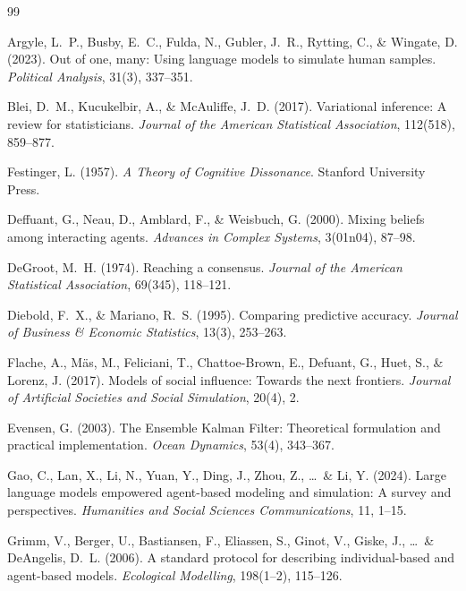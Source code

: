 \documentclass[12pt]{article}
\begin{document}
\begin{thebibliography}{99}

Argyle, L.~P., Busby, E.~C., Fulda, N., Gubler, J.~R., Rytting, C., \& Wingate, D. (2023).
\newblock Out of one, many: Using language models to simulate human samples.
\newblock \textit{Political Analysis}, 31(3), 337--351.

Blei, D.~M., Kucukelbir, A., \& McAuliffe, J.~D. (2017).
\newblock Variational inference: A review for statisticians.
\newblock \textit{Journal of the American Statistical Association}, 112(518), 859--877.

Festinger, L. (1957).
\newblock \textit{A Theory of Cognitive Dissonance}.
\newblock Stanford University Press.

Deffuant, G., Neau, D., Amblard, F., \& Weisbuch, G. (2000).
\newblock Mixing beliefs among interacting agents.
\newblock \textit{Advances in Complex Systems}, 3(01n04), 87--98.

DeGroot, M.~H. (1974).
\newblock Reaching a consensus.
\newblock \textit{Journal of the American Statistical Association}, 69(345), 118--121.

Diebold, F.~X., \& Mariano, R.~S. (1995).
\newblock Comparing predictive accuracy.
\newblock \textit{Journal of Business \& Economic Statistics}, 13(3), 253--263.

Flache, A., M\"as, M., Feliciani, T., Chattoe-Brown, E., Defuant, G., Huet, S., \& Lorenz, J. (2017).
\newblock Models of social influence: Towards the next frontiers.
\newblock \textit{Journal of Artificial Societies and Social Simulation}, 20(4), 2.

Evensen, G. (2003).
\newblock The Ensemble Kalman Filter: Theoretical formulation and practical implementation.
\newblock \textit{Ocean Dynamics}, 53(4), 343--367.

Gao, C., Lan, X., Li, N., Yuan, Y., Ding, J., Zhou, Z., \ldots\ \& Li, Y. (2024).
\newblock Large language models empowered agent-based modeling and simulation: A survey and perspectives.
\newblock \textit{Humanities and Social Sciences Communications}, 11, 1--15.

Grimm, V., Berger, U., Bastiansen, F., Eliassen, S., Ginot, V., Giske, J., \ldots\ \& DeAngelis, D.~L. (2006).
\newblock A standard protocol for describing individual-based and agent-based models.
\newblock \textit{Ecological Modelling}, 198(1--2), 115--126.


\end{thebibliography}
\end{document}
